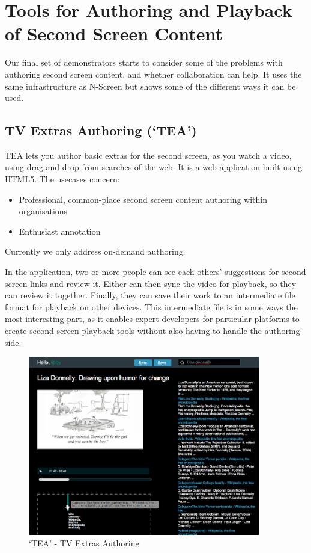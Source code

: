 \documentclass{notube}
\begin{document}
\section{Tools for Authoring and Playback of Second Screen Content}

Our final set of demonstrators starts to consider some of the problems with authoring second screen content, and whether collaboration can help. It uses the same infrastructure as N-Screen but shows some of the different ways it can be used.

\subsection{TV Extras Authoring (`TEA')}

TEA lets you author basic extras for the second screen, as you watch a video, using drag and drop from searches of the web. It is a web application built using HTML5. The usecases concern:

\begin{itemize}
\item{Professional, common-place second screen content authoring within organisations}
\item{Enthusiast annotation}
\end{itemize}

Currently we only address on-demand authoring.

In the application, two or more people can see each others' suggestions for second screen links and review it. Either can then sync the video for playback, so they can review it together. Finally, they can save their work to an intermediate file format for playback on other devices. This intermediate file is in some ways the most interesting part, as it enables expert developers for particular platforms to create second screen playback tools without also having to handle the authoring side.

\begin{figure}[htbp]
\begin{center}
\includegraphics[width=4in]{images/tea.png}
\caption{`TEA' - TV Extras Authoring} \label{fig:tea}
\end{center}
\end{figure} 
\end{document}
